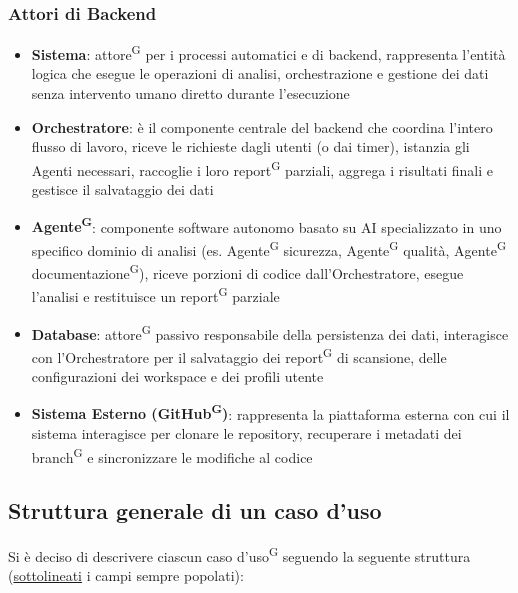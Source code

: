 \documentclass[a4paper, 11pt]{article}
\newcommand{\refterm}[1]{#1\textsuperscript{G}}
\begin{document}
\subsubsection{Attori di Backend}
    \begin{itemize}
        \item \textbf{Sistema}: attore\textsuperscript{G} per i processi automatici e di backend, rappresenta l'entità logica che esegue le operazioni di analisi, orchestrazione e gestione dei dati senza intervento umano diretto durante l'esecuzione

        \item \textbf{Orchestratore}: è il componente centrale del backend che coordina l'intero flusso di lavoro, riceve le richieste dagli utenti (o dai timer), istanzia gli Agenti necessari, raccoglie i loro report\textsuperscript{G} parziali, aggrega i risultati finali e gestisce il salvataggio dei dati

        \item \textbf{Agente\textsuperscript{G}}: componente software autonomo basato su AI specializzato in uno specifico dominio di analisi (es. Agente\textsuperscript{G} sicurezza, Agente\textsuperscript{G} qualità, Agente\textsuperscript{G} documentazione\textsuperscript{G}), riceve porzioni di codice dall'Orchestratore, esegue l'analisi e restituisce un report\textsuperscript{G} parziale

        \item \textbf{Database}: attore\textsuperscript{G} passivo responsabile della persistenza dei dati, interagisce con l'Orchestratore per il salvataggio dei report\textsuperscript{G} di scansione, delle configurazioni dei workspace e dei profili utente

        \item \textbf{Sistema Esterno (GitHub\textsuperscript{G})}: rappresenta la piattaforma esterna con cui il sistema interagisce per clonare le repository, recuperare i metadati dei branch\textsuperscript{G} e sincronizzare le modifiche al codice
    \end{itemize}

\subsection{Struttura generale di un caso d'uso}
Si è deciso di descrivere ciascun \refterm{caso d'uso} seguendo la seguente struttura (\underline{sottolineati} i campi sempre popolati):
\end{document}
